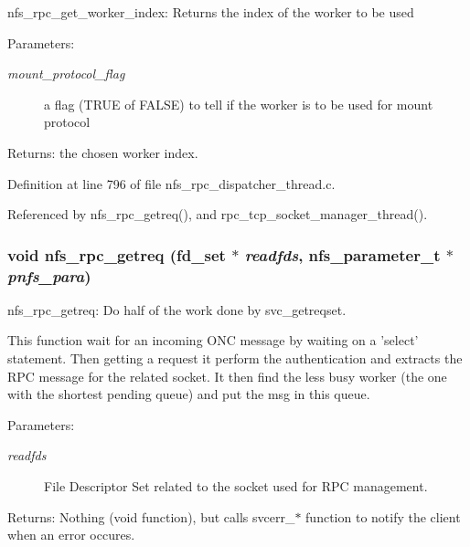 nfs\_\-rpc\_\-get\_\-worker\_\-index: Returns the index of the worker to be used

\begin{Desc}
\item[Parameters:]
\begin{description}
\item[{\em mount\_\-protocol\_\-flag}]a flag (TRUE of FALSE) to tell if the worker is to be used for mount protocol\end{description}
\end{Desc}
\begin{Desc}
\item[Returns:]the chosen worker index. \end{Desc}


Definition at line 796 of file nfs\_\-rpc\_\-dispatcher\_\-thread.c.

Referenced by nfs\_\-rpc\_\-getreq(), and rpc\_\-tcp\_\-socket\_\-manager\_\-thread().
\subsubsection{\setlength{\rightskip}{0pt plus 5cm}void nfs\_\-rpc\_\-getreq (fd\_\-set $\ast$ {\em readfds}, nfs\_\-parameter\_\-t $\ast$ {\em pnfs\_\-para})}\label{nfs__rpc__dispatcher__thread_8c_a23}


nfs\_\-rpc\_\-getreq: Do half of the work done by svc\_\-getreqset.

This function wait for an incoming ONC message by waiting on a 'select' statement. Then getting a request it perform the authentication and extracts the RPC message for the related socket. It then find the less busy worker (the one with the shortest pending queue) and put the msg in this queue.

\begin{Desc}
\item[Parameters:]
\begin{description}
\item[{\em readfds}]File Descriptor Set related to the socket used for RPC management.\end{description}
\end{Desc}
\begin{Desc}
\item[Returns:]Nothing (void function), but calls svcerr\_\-$\ast$ function to notify the client when an error occures. \end{Desc}


